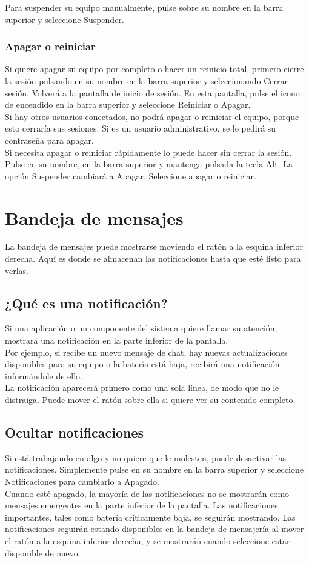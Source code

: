 Para suspender su equipo manualmente, pulse sobre su nombre en la barra superior y seleccione Suspender.
\subsubsection{Apagar o reiniciar}
Si quiere apagar su equipo por completo o hacer un reinicio total, primero cierre la sesión pulsando en su nombre en la barra superior y seleccionando Cerrar sesión. Volverá a la pantalla de inicio de sesión. En esta pantalla, pulse el icono de encendido en la barra superior y seleccione Reiniciar o Apagar.\\
Si hay otros usuarios conectados, no podrá apagar o reiniciar el equipo, porque esto cerraría sus sesiones. Si es un usuario administrativo, se le pedirá su contraseña para apagar.\\

Si necesita apagar o reiniciar rápidamente lo puede hacer sin cerrar la sesión. Pulse en su nombre, en la barra superior y mantenga pulsada la tecla Alt. La opción Suspender cambiará a Apagar. Seleccione apagar o reiniciar.
\section{Bandeja de mensajes}
La bandeja de mensajes puede mostrarse moviendo el ratón a la esquina inferior derecha. Aquí es donde se almacenan las notificaciones hasta que esté listo para verlas.
\subsection{¿Qué es una notificación?}
Si una aplicación o un componente del sistema quiere llamar su atención, mostrará una notificación en la parte inferior de la pantalla.\\
Por ejemplo, si recibe un nuevo mensaje de chat, hay nuevas actualizaciones disponibles para su equipo o la batería está baja, recibirá una notificación informándole de ello.\\

La notificación aparecerá primero como una sola línea, de modo que no le distraiga. Puede mover el ratón sobre ella si quiere ver su contenido completo.

\subsection{Ocultar notificaciones}
Si está trabajando en algo y no quiere que le molesten, puede desactivar las notificaciones. Simplemente pulse en su nombre en la barra superior y seleccione Notificaciones para cambiarlo a Apagado.\\
Cuando esté apagado, la mayoría de las notificaciones no se mostrarán como mensajes emergentes en la parte inferior de la pantalla. Las notificaciones importantes, tales como batería críticamente baja, se seguirán mostrando. Las notificaciones seguirán estando disponibles en la bandeja de mensajería al mover el ratón a la esquina inferior derecha, y se mostrarán cuando seleccione estar disponible de nuevo.